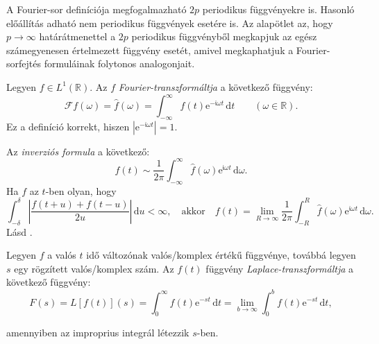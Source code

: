 \documentclass[%
	DIV=15,appendixprefix]{scrreprt}
\theoremstyle{definition}
\theoremstyle{remark}
\newcommand{\imag}{\mathfrak{i}}
\begin{document}
A Fourier-sor definíciója megfogalmazható $ 2 p $ periodikus függvényekre is. Hasonló előállítás
adható nem periodikus függvények esetére is. Az alapötlet az, hogy $ p \rightarrow \infty $
határátmenettel a $ 2 p $ periodikus függvényből megkapjuk az egész számegyenesen értelmezett
függvény esetét, amivel megkaphatjuk a Fourier-sorfejtés formuláinak folytonos analogonjait.

Legyen $ f \in L^{ 1 } \left( \mathbb{ R } \right) $. Az $ f $ \emph{Fourier-transzformáltja} a
következő függvény:
\begin{equation*}
	\mathcal{ F } f \left( \omega \right) = \hat{ f } \left( \omega \right)  = \int_{ - \infty }^{
	\infty } f \left( t \right)
	\mathrm{ e }^{ - \imag \omega t } \, \mathrm{ d } t \qquad \left( \omega \in \mathbb{ R }
	\right).
\end{equation*}
Ez a definíció korrekt, hiszen $ \left| \mathrm{ e }^{ - \imag \omega t } \right| = 1 $.

Az \emph{inverziós formula} a következő:
\begin{equation*}
	f \left( t \right) \sim \frac{ 1 }{ 2 \pi } \int_{ - \infty }^{ \infty } \hat{ f } \left( \omega
	\right) \mathrm{ e }^{ \imag \omega t } \, \mathrm{ d } \omega.
\end{equation*}
Ha $ f $ az $ t $-ben olyan, hogy
\begin{equation*}
	\int_{ - \delta }^{ \delta } \left| \frac{f \left( t + u \right) + f \left( t - u \right) }{ 2
	u } \right| \, \mathrm{ d } u < \infty, \quad \text{akkor} \quad f \left( t \right) = \lim_{ R
	\rightarrow \infty } \frac{ 1 }{ 2 \pi } \int_{ - R }^{ R } \hat{ f } \left( \omega
	\right)\mathrm{ e }^{ \imag \omega t } \, \mathrm{ d }\omega.
\end{equation*}
%
Lásd \cite[6.1--6.4~szakaszok]{SzTNZ}.

Legyen $ f $ a valós $ t $ idő változónak valós/komplex értékű függvénye, továbbá legyen $ s $ egy
rögzített valós/komplex szám. Az $ f \left( t \right) $ függvény \emph{Laplace-transzformáltja} a
következő függvény:
\begin{equation*}
	F \left( s \right) = L \left[ f \left( t \right) \right] \left( s \right) =
	\int_{ 0 }^{ \infty } f \left( t \right) \mathrm{ e }^{ - s t } \, \mathrm{ d } t =
	\lim_{ b \rightarrow \infty } \int_{ 0 }^{ b } f \left( t \right) \mathrm{ e }^{ - s t } \,
	\mathrm{ d } t,
\end{equation*}

amennyiben az improprius integrál létezzik $ s $-ben.
\end{document}
